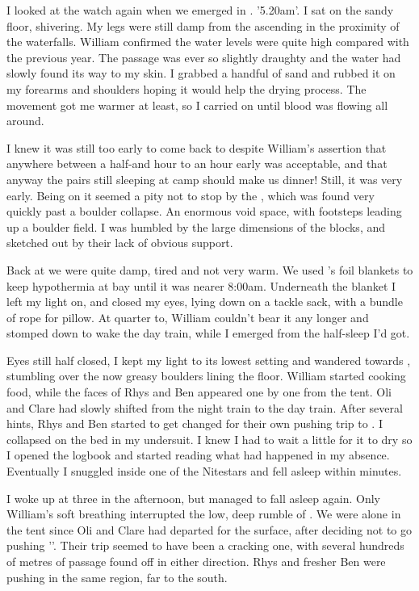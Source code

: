 I looked at the watch again when we emerged in . '5.20am'. I sat on the sandy floor, shivering. My legs were still damp from the ascending in the proximity of the waterfalls. William confirmed the water levels were quite high compared with the previous year. The passage was ever so slightly draughty and the water had slowly found its way to my skin. I grabbed a handful of sand and rubbed it on my forearms and shoulders hoping it would help the drying process. The movement got me warmer at least, so I carried on until blood was flowing all around. 

I knew it was still too early to come back to  despite William's assertion that anywhere between a half-and hour to an hour early was acceptable, and that anyway the pairs still sleeping at camp should make us dinner! Still, it was very early. Being on  it seemed a pity not to stop by the , which was found very quickly past a boulder collapse. An enormous void space, with footsteps leading up a boulder field. I was humbled by the large dimensions of the blocks, and sketched out by their lack of obvious support. 

Back at  we were quite damp, tired and not very warm. We used 's foil blankets to keep hypothermia at bay until it was nearer 8:00am. Underneath the blanket I left my light on, and closed my eyes, lying down on a tackle sack, with a bundle of rope for pillow. At quarter to, William couldn't bear it any longer and stomped down  to wake the day train, while I emerged from the half-sleep I'd got. 

Eyes still half closed, I kept my light to its lowest setting and wandered towards , stumbling over the now greasy boulders lining the floor. William started cooking food, while the faces of Rhys and Ben appeared one by one from the tent. Oli and Clare had slowly shifted from the night train to the day train. After several hints, Rhys and Ben started to get changed for their own pushing trip to . I collapsed on the bed in my undersuit. I knew I had to wait a little for it to dry so I opened the logbook and started reading what had happened in my absence. Eventually I snuggled inside one of the Nitestars and fell asleep within minutes.

I woke up at three in the afternoon, but managed to fall asleep again. Only William's soft breathing interrupted the low, deep rumble of . We were alone in the tent since Oli and Clare had departed for the surface, after deciding not to go pushing ''. Their trip seemed to have been a cracking one, with several hundreds of metres of passage found off  in either direction. Rhys and fresher Ben were pushing in the same region, far to the south.

